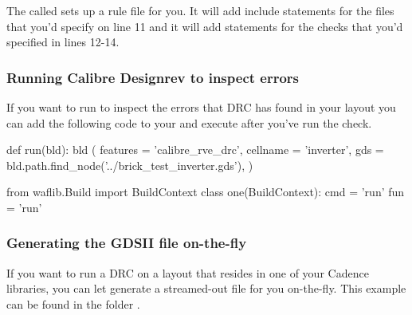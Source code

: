 The  called  sets up a rule file
for you. It will add include statements for the files that you'd specify
on line 11 and it will add  statements for the checks that
you'd specified in lines 12-14.

\subsubsection{Running Calibre Designrev to inspect errors}
If you want to run  to inspect the errors that \gls{DRC}
has found in your layout you can add the following code to your 
and execute  after you've run the check.

\begin{lstwscript}
def run(bld):
    bld (
        features = 'calibre_rve_drc',
        cellname = 'inverter',
        gds = bld.path.find_node('../brick_test_inverter.gds'),                                                                                                               
    )   

from waflib.Build import BuildContext
class one(BuildContext):
    cmd = 'run'
    fun = 'run'
\end{lstwscript}

\subsubsection{Generating the GDSII file on-the-fly}
If you want to run a \gls{DRC} on a layout that resides in one of your Cadence
libraries, you can let  generate a streamed-out  file for
you on-the-fly.
This example can be found in the folder
.

